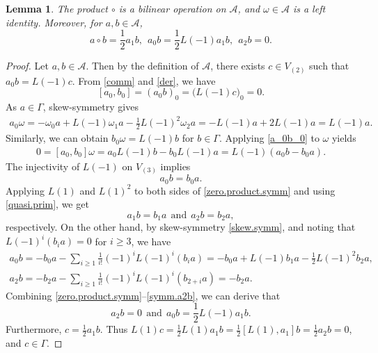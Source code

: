 \documentclass[12pt]{article}
\numberwithin{equation}{section}
\newtheorem{lemma}[theorem]{Lemma}
\theoremstyle{definition}
\theoremstyle{plain}
\newcommand{\cA}{\ensuremath{\mathcal{A}}}
\begin{document}
\begin{lemma}\label{lem:alg.A.o}
    The product $\circ$ is a bilinear operation on $\cA$, and $\omega\in\cA$ is a left identity. Moreover, for $a,b\in\cA$,
    \begin{equation}\label{a2b}
        a\circ b=\frac12a_1b,\ \ a_0b=\frac12L(-1)a_1b,\ \ a_2b=0.
    \end{equation}
\end{lemma}
\begin{proof}
    Let $a,b\in \cA$. Then by the definition of $\cA$, there exists $c\in V_{(2)}$ such that $a_0b=L(-1)c$. From \eqref{comm} and \eqref{der}, we have
    \begin{equation}\label{a_0b_0}
        [a_0,b_0]=(a_0b)_0=\big(L(-1)c\big)_0=0.
    \end{equation}
    As $a\in\Gamma$, skew-symmetry gives
    \begin{align*}
        a_0\omega=-\omega_0a+L(-1)\omega_1a-\frac{1}{2}L(-1)^2\omega_2a=-L(-1)a+2L(-1)a=L(-1)a.
    \end{align*}
    Similarly, we can obtain $b_0\omega=L(-1)b$ for $b\in\Gamma$. Applying \eqref{a_0b_0} to $\omega$ yields
    \begin{align*}
        0=[a_0,b_0]\omega=a_0L(-1)b-b_0L(-1)a=L(-1)(a_0b-b_0a).
    \end{align*}
    The injectivity of $L(-1)$ on $V_{(3)}$ implies
    \begin{equation}\label{zero.product.symm}
        a_0b=b_0a.
    \end{equation}
    Applying $L(1)$ and $L(1)^2$ to both sides of \eqref{zero.product.symm} and using \eqref{quasi.prim}, we get
    \begin{equation}\label{a1b,a2b}
        a_1b=b_1a\ \ \text{and}\ \ a_2b=b_2a,
    \end{equation}
    respectively. On the other hand, by skew-symmetry \eqref{skew.symm}, and noting that $L(-1)^i(b_ia)=0$ for $i\ge 3$, we have
    \begin{gather}
    a_0b=-b_0a-\sum_{i\ge 1}\frac{1}{i!}(-1)^iL(-1)^i(b_ia)=-b_0a+L(-1)b_1a-\frac{1}{2}L(-1)^2b_2a,\label{symm.a0b}\\
        a_2b=-b_2a-\sum_{i\ge1}\frac{1}{i!}(-1)^iL(-1)^i(b_{2+i}a)=-b_2a.\label{symm.a2b}
    \end{gather}
    Combining \eqref{zero.product.symm}--\eqref{symm.a2b}, we can derive that
    \begin{equation*}
        a_2b=0\ \ \text{and}\ \ a_0b=\frac{1}{2}L(-1)a_1b.
    \end{equation*}
    Furthermore, $c=\frac{1}{2}a_1b$. Thus $L(1)c=\frac{1}{2}L(1)a_1b=\frac{1}{2}[L(1),a_1]b=\frac{1}{2}a_2b=0$, and $c\in\Gamma$.


\end{proof}
\end{document}
